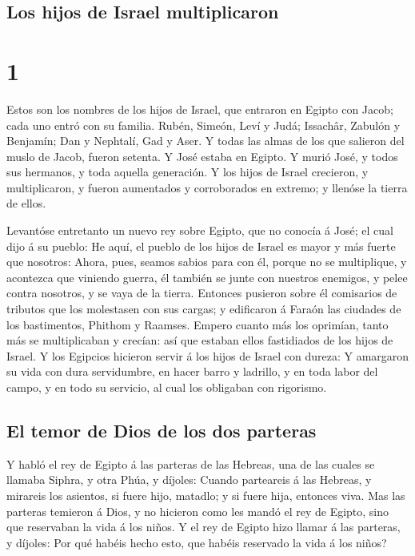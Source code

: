 \hypertarget{los-hijos-de-israel-multiplicaron}{%
\subsection{Los hijos de Israel
multiplicaron}\label{los-hijos-de-israel-multiplicaron}}

\hypertarget{section}{%
\section{1}\label{section}}

 Estos son los nombres de los hijos de Israel, que entraron
en Egipto con Jacob; cada uno entró con su familia.  Rubén,
Simeón, Leví y Judá;  Issachâr, Zabulón y Benjamín;
 Dan y Nephtalí, Gad y Aser.  Y todas las almas
de los que salieron del muslo de Jacob, fueron setenta. Y José estaba en
Egipto.  Y murió José, y todos sus hermanos, y toda aquella
generación.  Y los hijos de Israel crecieron, y
multiplicaron, y fueron aumentados y corroborados en extremo; y llenóse
la tierra de ellos.

 Levantóse entretanto un nuevo rey sobre Egipto, que no
conocía á José; el cual dijo á su pueblo:  He aquí, el
pueblo de los hijos de Israel es mayor y más fuerte que nosotros:
 Ahora, pues, seamos sabios para con él, porque no se
multiplique, y acontezca que viniendo guerra, él también se junte con
nuestros enemigos, y pelee contra nosotros, y se vaya de la tierra.
 Entonces pusieron sobre él comisarios de tributos que los
molestasen con sus cargas; y edificaron á Faraón las ciudades de los
bastimentos, Phithom y Raamses.  Empero cuanto más los
oprimían, tanto más se multiplicaban y crecían: así que estaban ellos
fastidiados de los hijos de Israel.  Y los Egipcios
hicieron servir á los hijos de Israel con dureza:  Y
amargaron su vida con dura servidumbre, en hacer barro y ladrillo, y en
toda labor del campo, y en todo su servicio, al cual los obligaban con
rigorismo.

\hypertarget{el-temor-de-dios-de-los-dos-parteras}{%
\subsection{El temor de Dios de los dos
parteras}\label{el-temor-de-dios-de-los-dos-parteras}}

 Y habló el rey de Egipto á las parteras de las Hebreas,
una de las cuales se llamaba Siphra, y otra Phúa, y díjoles:
 Cuando parteareis á las Hebreas, y mirareis los asientos,
si fuere hijo, matadlo; y si fuere hija, entonces viva. 
Mas las parteras temieron á Dios, y no hicieron como les mandó el rey de
Egipto, sino que reservaban la vida á los niños.  Y el rey
de Egipto hizo llamar á las parteras, y díjoles: Por qué habéis hecho
esto, que habéis reservado la vida á los niños?

